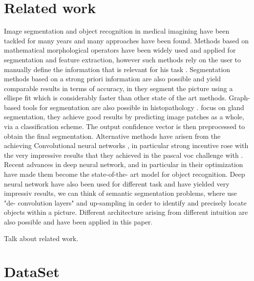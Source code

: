 \documentclass{article}
\begin{document}
\section{Related work}
\label{sec:related}
Image segmentation and object recognition in medical imagining have 
been tackled for many years and many approaches have been found. 
Methods based on mathematical morphological operators have been 
widely used and applied for segmentation and feature extraction, 
however such methods rely on the user to manually define the 
information that is relevant for his task \cite{irshad2014methods}. 
Segmentation methods based on a strong priori information are also 
possible and yield comparable results in terms of accuracy, in 
\cite{ranefall2016fast} they segment the picture using a ellispe fit 
which is considerably faster than other state of the art methods. Graph-
based tools for segmentation are also possible in histopathology 
\cite{ta2009graph}. \cite{manivannanlocal} focus on gland 
segmentation, they achieve good results by predicting image patches as 
a whole, via a classification scheme. The output confidence vector is 
then preprocessed to obtain the final segmentation. Alternative methods 
have arisen from the achieving Convolutional neural networks 
\cite{lecun}, in particular strong incentive rose with the very impressive 
results that they achieved in the pascal voc challenge with 
\cite{ImageNet}. Recent advances in deep neural network, and in 
particular in their optimization have made them become the state-of-the-
art model for object recognition.  Deep neural network have also been 
used for different task and have yielded very impressiv results, we can think of 
semantic segmentation problems, where \cite{long2015fcn} use "de-
convolution layers" and up-sampling in order to identify and precisely 
locate objects within a picture. Different architecture arising from 
different intuition are also possible and have been applied in this paper.



Talk about related work.

\section{DataSet}
\label{sec:dataset}
\end{document}
